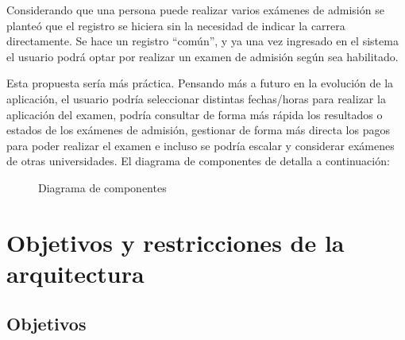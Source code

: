 \documentclass[12pt,a4paper]{article}
\begin{document}
Considerando que una persona puede realizar varios exámenes de admisión se planteó que el registro se hiciera sin la necesidad de indicar la carrera directamente. Se hace un registro ``común'', y ya una vez ingresado en el sistema el usuario podrá optar por realizar un examen de admisión según sea habilitado.

Esta propuesta sería más práctica. Pensando más a futuro en la evolución de la aplicación, el usuario podría seleccionar distintas fechas/horas para realizar la aplicación del examen, podría consultar de forma más rápida los resultados o estados de los exámenes de admisión, gestionar de forma más directa los pagos para poder realizar el examen e incluso se podría escalar y considerar exámenes de otras universidades.
El diagrama de componentes de detalla a continuación:
\begin{figure}[H]
  \centering
  \caption{Diagrama de componentes}
  \label{fig:diagComponentes}
\end{figure}

\section{Objetivos y restricciones de la arquitectura}

\subsection{Objetivos}
\end{document}
